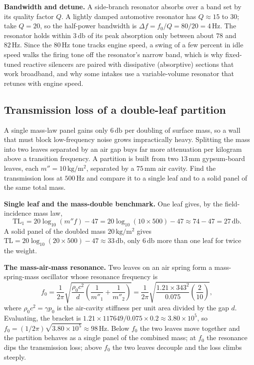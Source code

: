 \textbf{Bandwidth and detune.} A side-branch resonator absorbs over a
band set by its quality factor $Q$. A lightly damped automotive
resonator has $Q\approx 15$ to $30$; take $Q=20$, so the half-power
bandwidth is $\Delta f = f_0/Q = 80/20 = 4\,\si{\hertz}$. The resonator
holds within $3\,\si{\decibel}$ of its peak absorption only between about
$78$ and $82\,\si{\hertz}$. Since the $80\,\si{\hertz}$ tone tracks
engine speed, a swing of a few percent in idle speed walks the firing
tone off the resonator's narrow band, which is why fixed-tuned reactive
silencers are paired with dissipative (absorptive) sections that work
broadband, and why some intakes use a variable-volume resonator that
retunes with engine speed.

\subsection{Transmission loss of a double-leaf partition}

A single mass-law panel gains only $6\,\si{\decibel}$ per doubling of
surface mass, so a wall that must block low-frequency noise grows
impractically heavy. Splitting the mass into two leaves separated by an
air gap buys far more attenuation per kilogram above a transition
frequency. A partition is built from two $13\,\si{\milli\meter}$
gypsum-board leaves, each $m''=10\,\si{\kilogram\per\meter\squared}$,
separated by a $75\,\si{\milli\meter}$ air cavity. Find the transmission
loss at $500\,\si{\hertz}$ and compare it to a single leaf and to a solid
panel of the same total mass.

\textbf{Single leaf and the mass-double benchmark.} One leaf gives, by the
field-incidence mass law,
\[
\text{TL}_1 = 20\log_{10}(m''f) - 47
            = 20\log_{10}(10\times 500) - 47
            \approx 74 - 47 = 27\,\si{\decibel}.
\]
A solid panel of the doubled mass $20\,\si{\kilogram\per\meter\squared}$
gives $\text{TL}=20\log_{10}(20\times 500)-47\approx 33\,\si{\decibel}$,
only $6\,\si{\decibel}$ more than one leaf for twice the weight.

\textbf{The mass-air-mass resonance.} Two leaves on an air spring form a
mass-spring-mass oscillator whose resonance frequency is
\[
f_0 = \frac{1}{2\pi}\sqrt{\frac{\rho_0 c^2}{d}\left(
\frac{1}{m''_1}+\frac{1}{m''_2}\right)}
    = \frac{1}{2\pi}\sqrt{\frac{1.21\times 343^2}{0.075}\left(
\frac{2}{10}\right)} ,
\]
where $\rho_0 c^2 = \gamma p_0$ is the air-cavity stiffness per unit
area divided by the gap $d$. Evaluating, the bracket is
$1.21\times 117649/0.075\times 0.2 \approx 3.80\times 10^{5}$, so
$f_0 = (1/2\pi)\sqrt{3.80\times 10^{5}}\approx 98\,\si{\hertz}$. Below
$f_0$ the two leaves move together and the partition behaves as a single
panel of the combined mass; at $f_0$ the resonance dips the transmission
loss; above $f_0$ the two leaves decouple and the loss climbs steeply.

